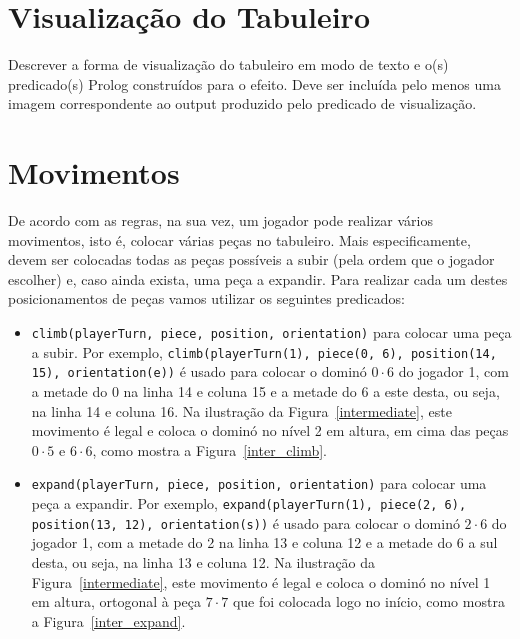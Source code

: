 \documentclass[a4paper]{article}
\begin{document}

\section{Visualização do Tabuleiro}

Descrever a forma de visualização do tabuleiro em modo de texto e o(s) predicado(s) Prolog construídos para o efeito.
Deve ser incluída pelo menos uma imagem correspondente ao output produzido pelo predicado de visualização.


\section{Movimentos}

De acordo com as regras, na sua vez, um jogador pode realizar vários movimentos, isto é, colocar várias peças no tabuleiro. Mais especificamente, devem ser colocadas todas as peças possíveis a subir (pela ordem que o jogador escolher) e, caso ainda exista, uma peça a expandir. Para realizar cada um destes posicionamentos de peças vamos utilizar os seguintes predicados:
\begin{itemize}
	\item
	\verb|climb(playerTurn, piece, position, orientation)| para colocar uma peça a subir. Por exemplo, \verb|climb(playerTurn(1), piece(0, 6), position(14, 15), orientation(e))| é usado para colocar o dominó $0 \cdot 6$ do jogador 1, com a metade do 0 na linha 14 e coluna 15 e a metade do 6 a este desta, ou seja, na linha 14 e coluna 16. Na ilustração da Figura~\ref{intermediate}, este movimento é legal e coloca o dominó no nível 2 em altura, em cima das peças $0 \cdot 5$ e $6 \cdot 6$, como mostra a Figura~\ref{inter_climb}.
	\item
	\verb|expand(playerTurn, piece, position, orientation)| para colocar uma peça a expandir. Por exemplo, \verb|expand(playerTurn(1), piece(2, 6), position(13, 12), orientation(s))| é usado para colocar o dominó $2 \cdot 6$ do jogador 1, com a metade do 2 na linha 13 e coluna 12 e a metade do 6 a sul desta, ou seja, na linha 13 e coluna 12. Na ilustração da Figura~\ref{intermediate}, este movimento é legal e coloca o dominó no nível 1 em altura, ortogonal à peça $7 \cdot 7$ que foi colocada logo no início, como mostra a Figura~\ref{inter_expand}.	
\end{itemize}
\end{document}
